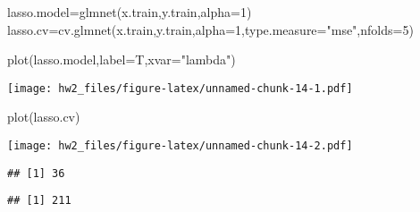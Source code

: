 \documentclass[
  11pt,
]{article}
\newenvironment{Shaded}{\begin{snugshade}}{\end{snugshade}}
\newcommand{\AttributeTok}[1]{\textcolor[rgb]{0.77,0.63,0.00}{#1}}
\newcommand{\DecValTok}[1]{\textcolor[rgb]{0.00,0.00,0.81}{#1}}
\newcommand{\FloatTok}[1]{\textcolor[rgb]{0.00,0.00,0.81}{#1}}
\newcommand{\FunctionTok}[1]{\textcolor[rgb]{0.00,0.00,0.00}{#1}}
\newcommand{\NormalTok}[1]{#1}
\newcommand{\OtherTok}[1]{\textcolor[rgb]{0.56,0.35,0.01}{#1}}
\newcommand{\SpecialCharTok}[1]{\textcolor[rgb]{0.00,0.00,0.00}{#1}}
\newcommand{\StringTok}[1]{\textcolor[rgb]{0.31,0.60,0.02}{#1}}
\begin{document}
\begin{Shaded}
\begin{Highlighting}[]
\NormalTok{lasso.model}\OtherTok{=}\FunctionTok{glmnet}\NormalTok{(x.train,y.train,}\AttributeTok{alpha=}\DecValTok{1}\NormalTok{)}
\NormalTok{lasso.cv}\OtherTok{=}\FunctionTok{cv.glmnet}\NormalTok{(x.train,y.train,}\AttributeTok{alpha=}\DecValTok{1}\NormalTok{,}\AttributeTok{type.measure=}\StringTok{"mse"}\NormalTok{,}\AttributeTok{nfolds=}\DecValTok{5}\NormalTok{)}

\FunctionTok{plot}\NormalTok{(lasso.model,}\AttributeTok{label=}\NormalTok{T,}\AttributeTok{xvar=}\StringTok{"lambda"}\NormalTok{)}
\end{Highlighting}
\end{Shaded}

\texttt{[image: hw2\_files/figure-latex/unnamed-chunk-14-1.pdf]}

\begin{Shaded}
\begin{Highlighting}[]
\FunctionTok{plot}\NormalTok{(lasso.cv) }
\end{Highlighting}
\end{Shaded}

\texttt{[image: hw2\_files/figure-latex/unnamed-chunk-14-2.pdf]}

\begin{Shaded}
\end{Shaded}

\begin{verbatim}
## [1] 36
\end{verbatim}

\begin{verbatim}
## [1] 211
\end{verbatim}

\begin{Shaded}
\end{Shaded}
\end{document}
